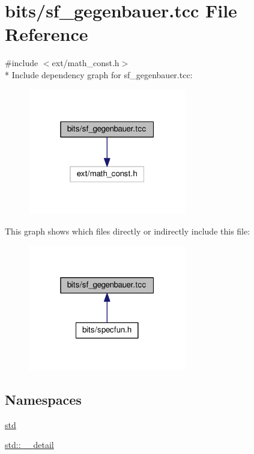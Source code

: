 \hypertarget{sf__gegenbauer_8tcc}{}\section{bits/sf\+\_\+gegenbauer.tcc File Reference}
\label{sf__gegenbauer_8tcc}
{\ttfamily \#include $<$ext/math\+\_\+const.\+h$>$}\\*
Include dependency graph for sf\+\_\+gegenbauer.\+tcc\+:
\nopagebreak
\begin{figure}[H]
\begin{center}
\leavevmode
\includegraphics[width=196pt]{sf__gegenbauer_8tcc__incl}
\end{center}
\end{figure}
This graph shows which files directly or indirectly include this file\+:
\nopagebreak
\begin{figure}[H]
\begin{center}
\leavevmode
\includegraphics[width=196pt]{sf__gegenbauer_8tcc__dep__incl}
\end{center}
\end{figure}
\subsection*{Namespaces}
\begin{DoxyCompactItemize}
\item 
 \hyperlink{namespacestd}{std}
\item 
 \hyperlink{namespacestd_1_1____detail}{std\+::\+\_\+\+\_\+detail}
\end{DoxyCompactItemize}
